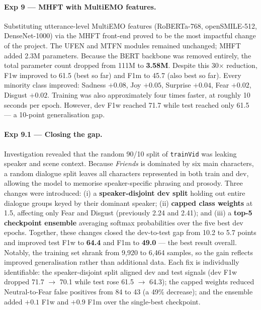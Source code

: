 \documentclass[11pt,twocolumn]{article}
\begin{document}
\paragraph{Exp 9 --- MHFT with MultiEMO features.} Substituting utterance-level MultiEMO \citep{shi2023multiemo} features (RoBERTa-768, openSMILE-512, DenseNet-1000) via the MHFT front-end proved to be the most impactful change of the project. The UFEN and MTFN modules remained unchanged; MHFT added 2.3M parameters. Because the BERT backbone was removed entirely, the total parameter count dropped from 111M to \textbf{3.58M}. Despite this 30$\times$ reduction, F1w improved to 61.5 (best so far) and F1m to 45.7 (also best so far). Every minority class improved: Sadness $+0.08$, Joy $+0.05$, Surprise $+0.04$, Fear $+0.02$, Disgust $+0.02$. Training was also approximately four times faster, at roughly 10 seconds per epoch. However, dev F1w reached 71.7 while test reached only 61.5 --- a 10-point generalisation gap.

\paragraph{Exp 9.1 --- Closing the gap.} Investigation revealed that the random 90/10 split of \texttt{trainVid} was leaking speaker and scene context. Because \emph{Friends} is dominated by six main characters, a random dialogue split leaves all characters represented in both train and dev, allowing the model to memorise speaker-specific phrasing and prosody. Three changes were introduced: (i) a \textbf{speaker-disjoint dev split} holding out entire dialogue groups keyed by their dominant speaker; (ii) \textbf{capped class weights} at 1.5, affecting only Fear and Disgust (previously 2.24 and 2.41); and (iii) a \textbf{top-5 checkpoint ensemble} averaging softmax probabilities over the five best dev epochs. Together, these changes closed the dev-to-test gap from 10.2 to 5.7 points and improved test F1w to \textbf{64.4} and F1m to \textbf{49.0} --- the best result overall. Notably, the training set shrank from 9{,}920 to 6{,}464 samples, so the gain reflects improved generalisation rather than additional data. Each fix is individually identifiable: the speaker-disjoint split aligned dev and test signals (dev F1w dropped 71.7 $\to$ 70.1 while test rose 61.5 $\to$ 64.3); the capped weights reduced Neutral-to-Fear false positives from 84 to 43 (a 49\% decrease); and the ensemble added $+0.1$ F1w and $+0.9$ F1m over the single-best checkpoint.

\end{document}
